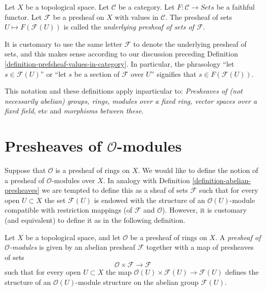 \begin{definition}
\label{definition-underlying-presheaf-sets}
Let $X$ be a topological space. Let $\mathcal{C}$ be a category.
Let $F : \mathcal{C} \to \textit{Sets}$ be a faithful functor.
Let $\mathcal{F}$ be a presheaf on $X$ with values in $\mathcal{C}$.
The presheaf of sets $U \mapsto F(\mathcal{F}(U))$
is called the {\it underlying presheaf of sets of $\mathcal{F}$}.
\end{definition}

\noindent
It is customary to use the same letter $\mathcal{F}$ to denote
the underlying presheaf of sets, and this makes
sense according to our discussion preceding
Definition \ref{definition-prefsheaf-values-in-category}.
In particular, the phrasology ``let $s \in \mathcal{F}(U)$''
or ``let $s$ be a section of $\mathcal{F}$ over $U$'' signifies
that $s \in F(\mathcal{F}(U))$.

\medskip\noindent
This notation and these definitions apply inparticular to:
{\it Presheaves of (not necessarily abelian) groups, rings, modules
over a fixed ring, vector spaces over a fixed field,} etc and
{\it morphisms between these}.

\section{Presheaves of $\mathcal{O}$-modules}
\label{section-presheaves-modules}

\noindent
Suppose that $\mathcal{O}$ is a presheaf of rings on $X$.
We would like to define the notion of a presheaf of
$\mathcal{O}$-modules over $X$. In analogy with Definition
\ref{definition-abelian-presheaves} we are tempted to define 
this as a sheaf of sets $\mathcal{F}$ such that for every open
$U \subset X$ the set $\mathcal{F}(U)$ is endowed with the structure
of an $\mathcal{O}(U)$-module compatible with restriction mappings
(of $\mathcal{F}$ and $\mathcal{O}$). However, it is customary
(and equivalent) to define it as in the following definition.

\begin{definition}
\label{definition-presheaf-modules}
Let $X$ be a topological space, and let $\mathcal{O}$ be
a presheaf of rings on $X$. A {\it presheaf of $\mathcal{O}$-modules}
is given by an abelian presheaf $\mathcal{F}$ together with a
map of presheaves of sets
$$
\mathcal{O} \times \mathcal{F} \longrightarrow \mathcal{F}
$$
such that for every open $U \subset X$ the map
$\mathcal{O}(U) \times \mathcal{F}(U) \to \mathcal{F}(U)$ 
defines the structure of an $\mathcal{O}(U)$-module
structure on the abelian group $\mathcal{F}(U)$.
\end{definition}

